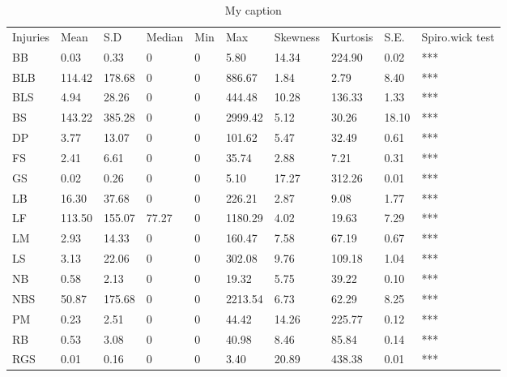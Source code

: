 \begin{table}[]
\centering
\caption{My caption}
\label{my-label}
\begin{tabular}{llllllllll}
Injuries & Mean   & S.D    & Median & Min & Max     & Skewness & Kurtosis & S.E.  & Spiro.wick test \\
BB       & 0.03   & 0.33   & 0      & 0   & 5.80    & 14.34    & 224.90   & 0.02  & ***             \\
BLB      & 114.42 & 178.68 & 0      & 0   & 886.67  & 1.84     & 2.79     & 8.40  & ***             \\
BLS      & 4.94   & 28.26  & 0      & 0   & 444.48  & 10.28    & 136.33   & 1.33  & ***             \\
BS       & 143.22 & 385.28 & 0      & 0   & 2999.42 & 5.12     & 30.26    & 18.10 & ***             \\
DP       & 3.77   & 13.07  & 0      & 0   & 101.62  & 5.47     & 32.49    & 0.61  & ***             \\
FS       & 2.41   & 6.61   & 0      & 0   & 35.74   & 2.88     & 7.21     & 0.31  & ***             \\
GS       & 0.02   & 0.26   & 0      & 0   & 5.10    & 17.27    & 312.26   & 0.01  & ***             \\
LB       & 16.30  & 37.68  & 0      & 0   & 226.21  & 2.87     & 9.08     & 1.77  & ***             \\
LF       & 113.50 & 155.07 & 77.27  & 0   & 1180.29 & 4.02     & 19.63    & 7.29  & ***             \\
LM       & 2.93   & 14.33  & 0      & 0   & 160.47  & 7.58     & 67.19    & 0.67  & ***             \\
LS       & 3.13   & 22.06  & 0      & 0   & 302.08  & 9.76     & 109.18   & 1.04  & ***             \\
NB       & 0.58   & 2.13   & 0      & 0   & 19.32   & 5.75     & 39.22    & 0.10  & ***             \\
NBS      & 50.87  & 175.68 & 0      & 0   & 2213.54 & 6.73     & 62.29    & 8.25  & ***             \\
PM       & 0.23   & 2.51   & 0      & 0   & 44.42   & 14.26    & 225.77   & 0.12  & ***             \\
RB       & 0.53   & 3.08   & 0      & 0   & 40.98   & 8.46     & 85.84    & 0.14  & ***             \\
RGS      & 0.01   & 0.16   & 0      & 0   & 3.40    & 20.89    & 438.38   & 0.01  & ***             \\

\end{tabular}
\end{table}
